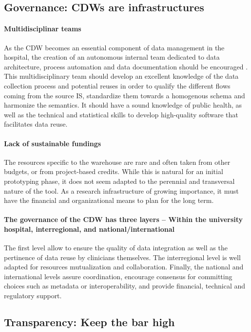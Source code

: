 \documentclass[french,12pt,twoside,a4paper]{book}
\begin{document}
\subsection{Governance: CDWs are infrastructures}%
\label{subsec:cdw:recommendations:governance}%

\paragraph{Multidisciplinar teams} As the CDW becomes an essential component of data management in the hospital,
the creation of an autonomous internal team dedicated to data architecture,
process automation and data documentation should be encouraged
\citep{goldacre_better_2022}. This multidisciplinary team should develop an
excellent knowledge of the data collection process and potential reuses in order
to qualify the different flows coming from the source IS, standardize them
towards a homogenous schema and harmonize the semantics. It should have a sound
knowledge of public health, as well as the technical and statistical skills to
develop high-quality software that facilitates data reuse.

\paragraph{Lack of sustainable fundings} The resources specific to the warehouse are rare and often taken from other
budgets, or from project-based credits. While this is natural for an initial
prototyping phase, it does not seem adapted to the perennial and transversal
nature of the tool. As a research infrastructure of growing importance, it must
have the financial and organizational means to plan for the long term.

\paragraph{The governance of the CDW has three layers -- Within the university
  hospital, interregional, and national/international} The first level allow to
ensure the quality of data integration as well as the pertinence of data reuse
by clinicians themselves. The interregional level is well adapted for resources
mutualization and collaboration. Finally, the national and international levels
assure coordination, encourage consensus for committing choices such as metadata
or interoperability, and provide financial, technical and regulatory support.


\subsection{Transparency: Keep the bar high}%
\label{subsec:cdw:recommendations:transparency}%
\end{document}
